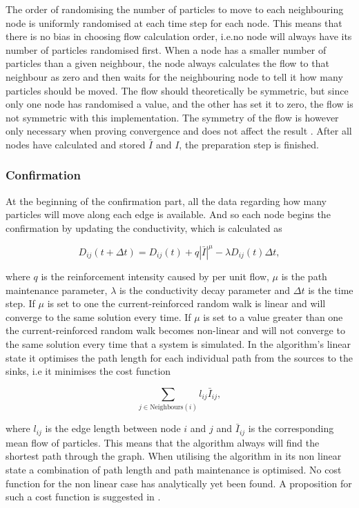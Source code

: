 The order of randomising the number of particles to move to each neighbouring node is uniformly randomised at each time step for each node. This means that there is no bias in choosing flow calculation order, i.e.\@ no node will always have its number of particles randomised first. When a node has a smaller number of particles than a given neighbour, the node always calculates the flow to that neighbour as zero and then waits for the neighbouring node to tell it how many particles should be moved. The flow should theoretically be symmetric, but since only one node has randomised a value, and the other has set it to zero, the flow is not symmetric with this implementation. The symmetry of the flow is however only necessary when proving convergence and does not affect the result \cite{Sumpter}. After all nodes have calculated and stored $\bar{I}$ and $I$, the preparation step is finished.

\subsubsection{Confirmation}
\label{sec:confirmation}
At the beginning of the confirmation part, all the data regarding how many particles will move along each edge is available. And so each node begins the confirmation by updating the conductivity, which is calculated as

\begin{equation}
D_{ij}(t + \Delta t) = D_{ij}(t) + q|\bar{I}|^\mu - \lambda D_{ij}(t)\Delta t,
\end{equation}

 \noindent where $q$ is the reinforcement intensity caused by per unit flow, $\mu$ is the path maintenance parameter, $\lambda$ is the conductivity decay parameter and $\Delta t$ is the time step. If $\mu$ is set to one the current-reinforced random walk is linear and will converge to the same solution every time. If $\mu$ is set to a value greater than one the current-reinforced random walk becomes non-linear and will not converge to the same solution every time that a system is simulated. In the algorithm's linear state it optimises the path length for each individual path from the sources to the sinks, i.e it minimises the cost function

\begin{equation}
\sum_{j \in \text{Neighbours}(i)} l_{ij} \bar{I}_{ij},
\end{equation}

 \noindent where $l_{ij}$ is the edge length between node $i$ and $j$ and $\bar{I}_{ij}$ is the corresponding mean flow of particles. This means that the algorithm always will find the shortest path through the graph. When utilising the algorithm in its non linear state a combination of path length and path maintenance is optimised. No cost function for the non linear case has analytically yet been found. A proposition for such a cost function is suggested in \cite{Sumpter}. 

